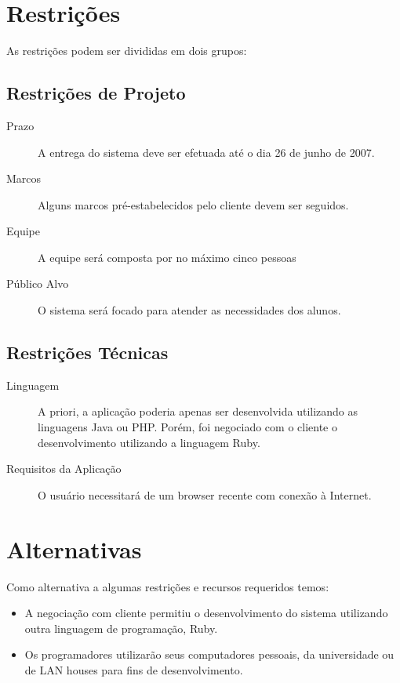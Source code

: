\documentclass[11pt]{article}
\begin{document}


\section{Restrições}
As restrições podem ser divididas em dois grupos:

\subsection{Restrições de Projeto}

\begin{description}
	\item[Prazo] A entrega do sistema deve ser efetuada até o dia 26 de junho de 2007.
	\item[Marcos] Alguns marcos pré-estabelecidos pelo cliente devem ser seguidos.
	\item[Equipe] A equipe será composta por no máximo cinco pessoas
	\item[Público Alvo] O sistema será focado para atender as necessidades dos alunos.
\end{description}

\subsection{Restrições Técnicas}

\begin{description}
	\item[Linguagem] A priori, a aplicação poderia apenas ser desenvolvida utilizando as linguagens Java ou PHP. Porém, foi negociado com o cliente o desenvolvimento utilizando a linguagem Ruby.
	\item[Requisitos da Aplicação] O usuário necessitará de um browser recente com conexão à Internet.
\end{description}



\section{Alternativas}

Como alternativa a algumas restrições e recursos requeridos temos:

\begin{itemize}   
	\item A negociação com cliente permitiu o desenvolvimento do sistema utilizando outra linguagem de programação, Ruby.
	\item Os programadores utilizarão seus computadores pessoais, da universidade ou de LAN houses para fins de desenvolvimento.
\end{itemize}
\end{document}

